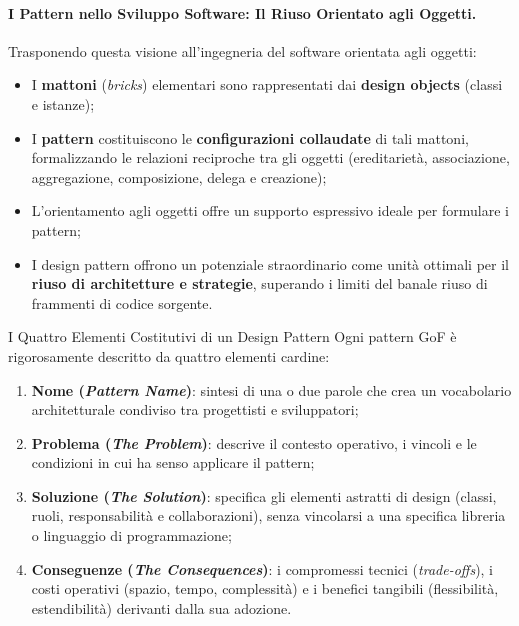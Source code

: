 \documentclass[12pt]{extarticle}
\begin{document}
\paragraph{I Pattern nello Sviluppo Software: Il Riuso Orientato agli Oggetti.}
Trasponendo questa visione all'ingegneria del software orientata agli oggetti:
\begin{itemize}
    \item I \textbf{mattoni} (\textit{bricks}) elementari sono rappresentati dai \textbf{design objects} (classi e istanze);
    \item I \textbf{pattern} costituiscono le \textbf{configurazioni collaudate} di tali mattoni, formalizzando le relazioni reciproche tra gli oggetti (ereditarietà, associazione, aggregazione, composizione, delega e creazione);
    \item L'orientamento agli oggetti offre un supporto espressivo ideale per formulare i pattern;
    \item I design pattern offrono un potenziale straordinario come unità ottimali per il \textbf{riuso di architetture e strategie}, superando i limiti del banale riuso di frammenti di codice sorgente.
\end{itemize}

\begin{cbox}{I Quattro Elementi Costitutivi di un Design Pattern}
\noindent Ogni pattern GoF è rigorosamente descritto da quattro elementi cardine:
\begin{enumerate}
    \item \textbf{Nome (\textit{Pattern Name})}: sintesi di una o due parole che crea un vocabolario architetturale condiviso tra progettisti e sviluppatori;
    \item \textbf{Problema (\textit{The Problem})}: descrive il contesto operativo, i vincoli e le condizioni in cui ha senso applicare il pattern;
    \item \textbf{Soluzione (\textit{The Solution})}: specifica gli elementi astratti di design (classi, ruoli, responsabilità e collaborazioni), senza vincolarsi a una specifica libreria o linguaggio di programmazione;
    \item \textbf{Conseguenze (\textit{The Consequences})}: i compromessi tecnici (\textit{trade-offs}), i costi operativi (spazio, tempo, complessità) e i benefici tangibili (flessibilità, estendibilità) derivanti dalla sua adozione.
\end{enumerate}
\end{cbox}
\end{document}
